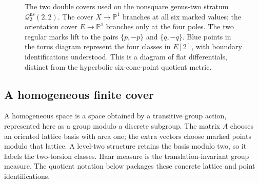 \begin{figure}[htbp]
\caption[The genus-two and marked-torus double covers]{The two double covers used on the nonsquare genus-two stratum
$\mathcal Q_2^{\mathrm{ns}}(2,2)$. The cover $X\to\mathbb P^1$ branches
at all six marked values; the orientation cover $E\to\mathbb P^1$
branches only at the four poles. The two regular marks lift to the pairs
$\{p,-p\}$ and $\{q,-q\}$. Blue points in the torus diagram represent
the four classes in $E[2]$, with boundary identifications understood.
This is a diagram of flat differentials, distinct from the hyperbolic
six-cone-point quotient metric.}
\label{fig:mono-double-covers}
\end{figure}

\subsection{A homogeneous finite cover}
\label{subsec:genus2homogeneous}

A homogeneous space is a space obtained by a transitive group
action, represented here as a group modulo a discrete subgroup.
The matrix $A$ chooses an oriented lattice basis with area one;
the extra vectors choose marked points modulo that lattice.
A level-two structure retains the basis modulo two, so it labels
the two-torsion classes. Haar measure is the translation-invariant
group measure. The quotient notation below packages these
concrete lattice and point identifications.

